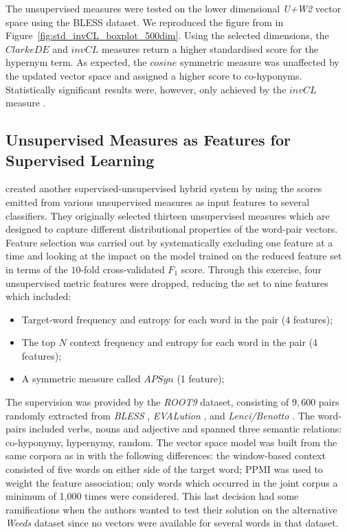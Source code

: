 The unsupervised measures were tested on the lower dimensional \textit{U+W2} vector space using the BLESS dataset.  We reproduced the figure from \citep{roller2014inclusive} in Figure~\ref{fig:std_invCL_boxplot_500dim}.
Using the selected dimensions, the $ClarkeDE$ and $invCL$ measures return a higher standardised score for the hypernym term.  As expected, the $cosine$ symmetric measure was unaffected by the updated vector space and assigned a higher score to co-hyponyms.  Statistically significant results were, however, only achieved by the $invCL$ measure \citep{roller2014inclusive}.

\subsection{Unsupervised Measures as Features for Supervised Learning}
\citet{santus2016nine} created another supervised-unsupervised hybrid system by using the scores emitted from various unsupervised measures as input features to several classifiers.  They originally selected thirteen unsupervised measures which are designed to capture different distributional properties of the word-pair vectors.  Feature selection was carried out by systematically excluding one feature at a time and looking at the impact on the model trained on the reduced feature set in terms of the $10$-fold cross-validated $F_1$ score.  Through this exercise, four unsupervised metric features were dropped, reducing the set to nine features which included:
\begin{itemize}
    \item Target-word frequency and entropy for each word in the pair (4 features);
    \item The top $N$ context frequency and entropy for each word in the pair (4 features); 
    \item A symmetric measure called $APSyn$ \citep{santus2016unsupervised} (1 feature);
\end{itemize}
 
The supervision was provided by the \textit{ROOT9} dataset, consisting of $9,600$ pairs randomly extracted from \textit{BLESS} \citep{Baroni2011}, \textit{EVALution} \citep{santus2015evalution}, and \textit{Lenci/Benotto} \citep{benotto2015distributional}.  The word-pairs included verbs, nouns and adjective and spanned three semantic relations: co-hyponymy, hypernymy, random.  The vector space model was built from the same corpora as in \citep{santus2014chasing} with the following differences: the window-based context consisted of five words on either side of the target word; \ac{PPMI} was used to weight the feature association; only words which occurred in the joint corpus a minimum of 1,000 times were considered.  This last decision had some ramifications when the authors wanted to test their solution on the alternative \textit{Weeds} dataset \citep{weeds2014learning} since no vectors were available for several words in that dataset.

